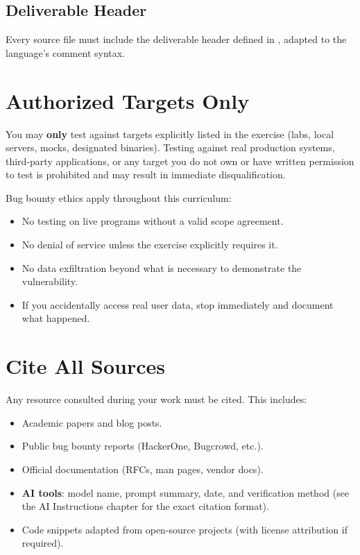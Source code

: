 \subsection*{Deliverable Header}

Every source file must include the deliverable header defined in
, adapted
to the language's comment syntax.

\section{Authorized Targets Only}

\begin{warning}
  You may \textbf{only} test against targets explicitly listed in
  the exercise (labs, local servers, mocks, designated binaries).
  Testing against real production systems, third-party applications,
  or any target you do not own or have written permission to test
  is prohibited and may result in immediate disqualification.
\end{warning}

Bug bounty ethics apply throughout this curriculum:
\begin{itemize}
  \item No testing on live programs without a valid scope agreement.
  \item No denial of service unless the exercise explicitly requires it.
  \item No data exfiltration beyond what is necessary to demonstrate
        the vulnerability.
  \item If you accidentally access real user data, stop immediately
        and document what happened.
\end{itemize}

\section{Cite All Sources}
\label{sec:cite-sources}

Any resource consulted during your work must be cited. This includes:

\begin{itemize}
  \item Academic papers and blog posts.
  \item Public bug bounty reports (HackerOne, Bugcrowd, etc.).
  \item Official documentation (RFCs, man pages, vendor docs).
  \item \textbf{AI tools}: model name, prompt summary, date, and
        verification method (see the AI Instructions chapter for
        the exact citation format).
  \item Code snippets adapted from open-source projects (with
        license attribution if required).
\end{itemize}

